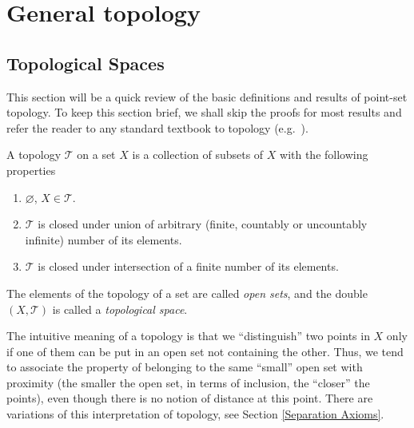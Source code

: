 \documentclass[english,letterpaper]{article}%
\numberwithin{equation}{section}
\numberwithin{figure}{section}
\numberwithin{table}{section}
\theoremstyle{definition}
\theoremstyle{definition}
\theoremstyle{definition}
\theoremstyle{plain}
\theoremstyle{plain}
\theoremstyle{plain}
\theoremstyle{plain}
\theoremstyle{remark}
\theoremstyle{remark}
\def\red{\color{red}}
\newcommand{\PRLsep}{   %
           \noindent\makebox[\linewidth]{
                \resizebox{0.5\linewidth}{1pt}{$\blacklozenge$}}}
\begin{document}

\section{General topology}

\subsection{Topological Spaces}

This section will be a quick review of the basic definitions and results of point-set topology. To keep this section brief, we shall skip the proofs for most results and refer the reader to any standard textbook to topology (e.g.~\cite{Munk}).

\begin{defn}[Topology]
A topology $\mathcal{{T}}$ on a set $X$ is a collection of subsets
of $X$ with the following properties
\begin{enumerate}
\item $\varnothing$, $X\in\mathcal{{T}}$.
\item $\mathcal{{T}}$ is closed under union of arbitrary (finite, countably
or uncountably infinite) number of its elements.
\item $\mathcal{{T}}$ is closed under intersection of a finite number of
its elements.
\end{enumerate}
The elements of the topology of a set are called \emph{open sets},
and the double $(X,\mathcal{{T}})$ is called a \emph{topological
space}.
\end{defn}

The intuitive meaning of a topology is that we ``distinguish'' two points in $X$ only if one of them can be put in an open set not containing the other. Thus, we tend to associate the property of belonging to the same ``small'' open set with proximity (the smaller the open set, in terms of inclusion, the ``closer'' the points), even though there is no notion of distance at this point. There are variations of this interpretation of topology, see Section \ref{Separation Axioms}.
\end{document}
